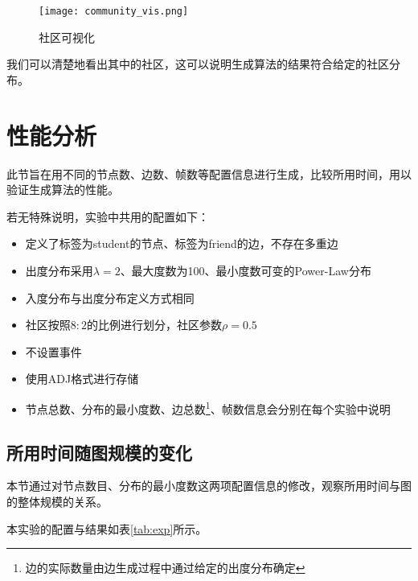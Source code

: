 \begin{figure}[H]
  \centering
  \texttt{[image: community\_vis.png]}
  \caption{社区可视化}
  \label{fig:community_vis}
\end{figure}

我们可以清楚地看出其中的社区，这可以说明生成算法的结果符合给定的社区分布。

\section{性能分析}

此节旨在用不同的节点数、边数、帧数等配置信息进行生成，比较所用时间，用以验证生成算法的性能。

若无特殊说明，实验中共用的配置如下：

\begin{itemize}
  \item 定义了标签为student的节点、标签为friend的边，不存在多重边
  \item 出度分布采用$\lambda=2$、最大度数为100、最小度数可变的Power-Law分布
  \item 入度分布与出度分布定义方式相同
  \item 社区按照$8:2$的比例进行划分，社区参数$\rho=0.5$
  \item 不设置事件
  \item 使用ADJ格式进行存储
  \item 节点总数、分布的最小度数、边总数\footnote{边的实际数量由边生成过程中通过给定的出度分布确定}、帧数信息会分别在每个实验中说明
\end{itemize}

\subsection{所用时间随图规模的变化}

本节通过对节点数目、分布的最小度数这两项配置信息的修改，观察所用时间与图的整体规模的关系。

本实验的配置与结果如表\ref{tab:exp}所示。

